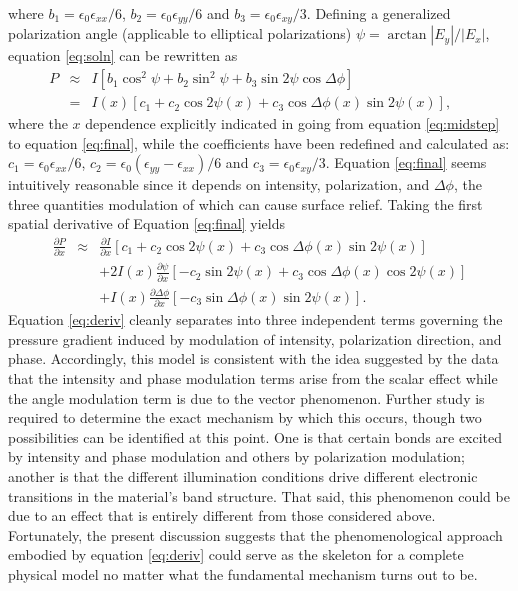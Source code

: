 \documentclass[twocolumn,showpacs,preprintnumbers,amsmath,amssymb]{revtex4}
\begin{document}
where $b_1 = \epsilon_0 \epsilon_{xx} / 6$, $b_2 =\epsilon_0
\epsilon_{yy} / 6$ and $b_3 = \epsilon_0 \epsilon_{xy} / 3$.
Defining a generalized polarization angle (applicable to elliptical polarizations)
$\psi=\arctan\left|E_y\right|/\left|E_x\right|$, equation
\ref{eq:soln} can be rewritten as
\begin{eqnarray}
P & \approx & I\left[b_1\cos^2\psi+b_2\sin^2\psi+b_3\sin2\psi\cos\Delta\phi\right] \ \ \ \ \ \label{eq:midstep}\\
& = & I(x)\left[c_1+c_2\cos2\psi(x)+c_3\cos\Delta\phi(x)\sin2\psi(x)\right]\mathrm{,} \ \
\ \ \ \  \label{eq:final}
\end{eqnarray}
where the $x$ dependence explicitly indicated in going
from equation \ref{eq:midstep} to equation \ref{eq:final}, while the
coefficients have been redefined and calculated as: $c_1 = \epsilon_0 \epsilon_{xx} / 6$, $c_2 =\epsilon_0
(\epsilon_{yy} - \epsilon_{xx}) / 6$ and $c_3 = \epsilon_0 \epsilon_{xy} / 3$. Equation \ref{eq:final} seems
intuitively reasonable since it depends on intensity, polarization, and $\Delta\phi$, the
three quantities modulation of which can cause surface relief. Taking the first spatial
derivative of Equation \ref{eq:final} yields
\begin{eqnarray}
\frac{\partial P}{\partial x}& \approx &\frac{\partial I}{\partial x}\left[c_1+c_2\cos2\psi(x)+c_3\cos\Delta\phi(x)\sin2\psi(x)\right] \nonumber\\
&&+2I(x)\frac{\partial \psi}{\partial x} \left[-c_2\sin2\psi(x)+c_3\cos\Delta\phi(x)\cos2\psi(x)\right] \nonumber\\
&&+I(x)\frac{\partial \Delta\phi}{\partial x}
\left[-c_3\sin\Delta\phi(x)\sin2\psi(x)\right] \mathrm{.} \label{eq:deriv}
\end{eqnarray}
Equation \ref{eq:deriv} cleanly separates into three independent terms
governing the pressure gradient induced by modulation of intensity,
polarization direction, and phase.  Accordingly, this model is
consistent with the idea suggested by the data that the intensity and
phase modulation terms arise from the scalar effect while the angle
modulation term is due to the vector phenomenon. Further study is
required to determine the exact mechanism by which this occurs, though
two possibilities can be identified at this point. One is that certain
bonds are excited by intensity and phase modulation and others by
polarization modulation; another is that the different illumination
conditions drive different electronic transitions in the material's
band structure. That said, this phenomenon could be due to an effect
that is entirely different from those considered above. Fortunately,
the present discussion suggests that the phenomenological approach
embodied by equation \ref{eq:deriv} could serve as the skeleton for a
complete physical model no matter what the fundamental mechanism turns
out to be.
\end{document}
